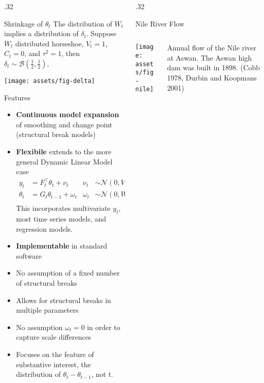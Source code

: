 \documentclass[final]{beamer}
\newcommand{\tran}{^\top}
\newcommand{\dist}[1]{\mathcal{#1}}
\newcommand{\paren}[1]{\ensuremath{\left(#1\right)}}
\newcommand{\dnorm}[1]{\ensuremath{\dist{N}\paren{#1}}}
\newcommand{\dbeta}[1]{\ensuremath{\dist{B}\paren{#1}}}
\def \ColTwo {.32\textwidth}
\begin{document}
\begin{frame}[fragile]
\begin{columns}[t]
\begin{column}{\ColTwo}
\begin{block}{Shrinkage of $\theta_{t}$}
        \vspace{1ex}
        The distribution of $W_{t}$ implies a distribution of $\delta_{t}$.
        Suppose $W_{t}$ distributed horseshoe, $V_{t} = 1$, $C_{t} = 0$, and $\tau^{2} = 1$,
        then $\delta_{t} \sim \dbeta{\frac{1}{2}, \frac{1}{2}}$,

        \begin{center}
          \texttt{[image: assets/fig-delta]}          
        \end{center}

      \end{block}

      \begin{block}{Features}
        \begin{itemize}

        \item \textbf{Continuous model expansion} of smoothing and change point (structural break models)
        \item \textbf{Flexibile} extends to the more general Dynamic Linear Model case
          \begin{align*}
            y_{t} &= F_{t} \tran \theta_{t} + \nu_{t} & \nu_{t} & \sim \dnorm{0, V_{t}} \\
            \theta_{t} &= G_{t} \theta_{t - 1} + \omega_{t} & \omega_{t} & \sim \dnorm{0, W_{t}} \\
          \end{align*}
          This incorporates multivariate $y_{t}$, most time series models, and regression models.
        \item \textbf{Implementable} in standard software
        \item No assumption of a fixed number of structural breaks
        \item Allows for structural breaks in multiple parameters
        \item No assumption $\omega_{t} = 0$ in order to capture scale differences
        \item Focuses on the feature of substantive interest, the distribution of $\theta_{t} - \theta_{t-1}$, not $t$.
        \end{itemize}
      \end{block}

    \end{column}

    \begin{column}{\ColTwo}
      \begin{block}{Nile River Flow}
        \begin{columns}
          \begin{column}{0.5\textwidth}
            \texttt{[image: assets/fig-nile]}            
          \end{column}
          \begin{column}{0.5\textwidth}
            Annual flow of the Nile river at Aswan. The Aswan high dam
            was built in 1898.  (Cobb 1978, Durbin and Koopmans 2001)


\end{column}
\end{columns}
\end{block}
\end{column}
\end{columns}
\end{frame}
\end{document}
